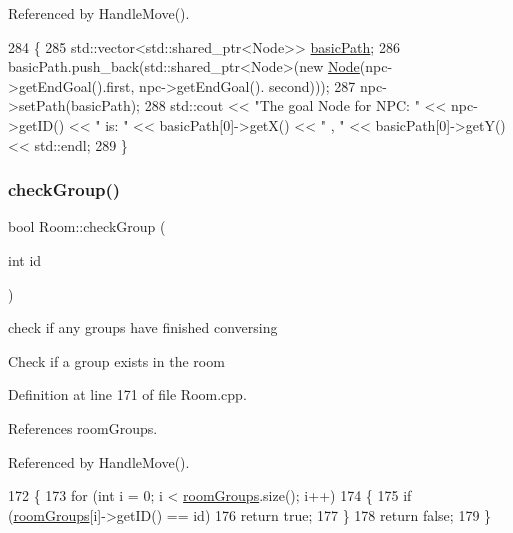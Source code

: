 Referenced by Handle\+Move().


\begin{DoxyCode}
284 \{
285     std::vector<std::shared\_ptr<Node>> \hyperlink{class_room_af25611552daa6c57915a0b0c98c40a8a}{basicPath};
286     basicPath.push\_back(std::shared\_ptr<Node>(\textcolor{keyword}{new} \hyperlink{class_node}{Node}(npc->getEndGoal().first, npc->getEndGoal().
      second)));
287     npc->setPath(basicPath);
288     std::cout << \textcolor{stringliteral}{"The goal Node for NPC: "} << npc->getID() << \textcolor{stringliteral}{" is: "} << basicPath[0]->getX() << \textcolor{stringliteral}{" , "} << 
      basicPath[0]->getY() << std::endl;
289 \}
\end{DoxyCode}
\mbox{\label{class_room_a0c1e8e264493205408553a998a068b29}} 
\subsubsection{\texorpdfstring{check\+Group()}{checkGroup()}}
{\footnotesize\ttfamily bool Room\+::check\+Group (\begin{DoxyParamCaption}\item[{int}]{id }\end{DoxyParamCaption})}



check if any groups have finished conversing 

Check if a group exists in the room 

Definition at line 171 of file Room.\+cpp.



References room\+Groups.



Referenced by Handle\+Move().


\begin{DoxyCode}
172 \{
173     \textcolor{keywordflow}{for} (\textcolor{keywordtype}{int} i = 0; i < \hyperlink{class_room_a2d63fa17f30d50dd5267f04170a662b0}{roomGroups}.size(); i++)
174     \{
175         \textcolor{keywordflow}{if} (\hyperlink{class_room_a2d63fa17f30d50dd5267f04170a662b0}{roomGroups}[i]->getID() == id)
176             \textcolor{keywordflow}{return} \textcolor{keyword}{true};
177     \}
178     \textcolor{keywordflow}{return} \textcolor{keyword}{false};
179 \}
\end{DoxyCode}
\mbox{\label{class_room_a03dc1536ef3b1ed301c76b08685e7103}} 
